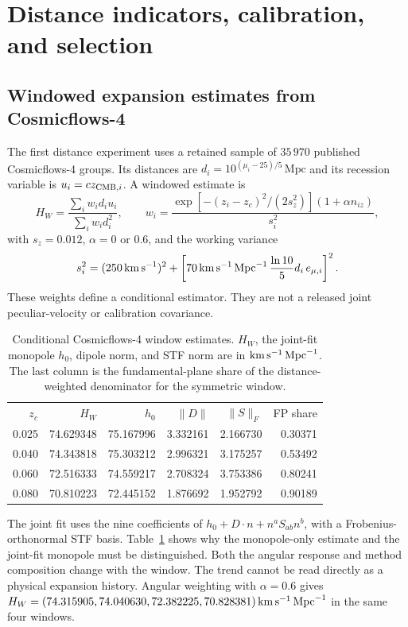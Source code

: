 \section{Distance indicators, calibration, and selection}
\label{sec:distance}

\subsection{Windowed expansion estimates from Cosmicflows-4}

The first distance experiment uses a retained sample of $35\,970$ published Cosmicflows-4 groups. Its distances are $d_i=10^{(\mu_i-25)/5}\,\mathrm{Mpc}$ and its recession variable is $u_i=cz_{{\rm CMB},i}$. A windowed estimate is
\begin{equation}
 H_W=\frac{\sum_i w_i d_i u_i}{\sum_i w_i d_i^2},\qquad
 w_i=\frac{\exp[-(z_i-z_c)^2/(2s_z^2)](1+\alpha n_{iz})}{s_i^2},
 \label{eq:hw}
\end{equation}
with $s_z=0.012$, $\alpha=0$ or $0.6$, and the working variance
\begin{equation}
 s_i^2=(250\,\mathrm{km}\,\mathrm{s}^{-1})^2+
 \left[70\,\mathrm{km}\,\mathrm{s}^{-1}\,\mathrm{Mpc}^{-1}\,\frac{\ln10}{5}d_i\,e_{\mu,i}\right]^2.
\end{equation}
These weights define a conditional estimator. They are not a released joint peculiar-velocity or calibration covariance.

\begin{table}[ht]
\caption{Conditional Cosmicflows-4 window estimates. $H_W$, the joint-fit monopole $h_0$, dipole norm, and STF norm are in $\mathrm{km}\,\mathrm{s}^{-1}\,\mathrm{Mpc}^{-1}$. The last column is the fundamental-plane share of the distance-weighted denominator for the symmetric window.}
\label{tab:cf4windows}
\begin{ruledtabular}\begin{tabular}{rrrrrr}
$z_c$ & $H_W$ & $h_0$ & $\|D\|$ & $\|S\|_F$ & FP share\\
0.025 &74.629348&75.167996&3.332161&2.166730&0.30371\\
0.040 &74.343818&75.303212&2.996321&3.175257&0.53492\\
0.060 &72.516333&74.559217&2.708324&3.753386&0.80241\\
0.080 &70.810223&72.445152&1.876692&1.952792&0.90189
\end{tabular}\end{ruledtabular}
\end{table}

The joint fit uses the nine coefficients of $h_0+D\cdot n+n^aS_{ab}n^b$, with a Frobenius-orthonormal STF basis. Table~\ref{tab:cf4windows} shows why the monopole-only estimate and the joint-fit monopole must be distinguished. Both the angular response and method composition change with the window. The trend cannot be read directly as a physical expansion history. Angular weighting with $\alpha=0.6$ gives $H_W=(74.315905,74.040630,72.382225,70.828381)\,\mathrm{km}\,\mathrm{s}^{-1}\,\mathrm{Mpc}^{-1}$ in the same four windows.

